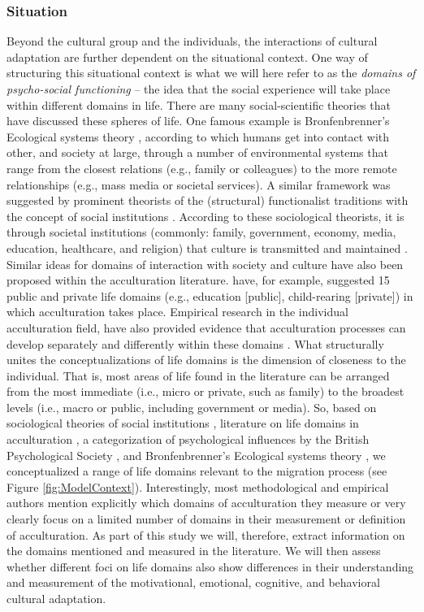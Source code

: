 \documentclass[man, 12pt, a4paper]{apa7}
\begin{document}
\subsubsection{Situation} 
Beyond the cultural group and the individuals, the interactions of cultural adaptation are further dependent on the situational context. One way of structuring this situational context is what we will here refer to as the \textit{domains of psycho-social functioning} -- the idea that the social experience will take place within different domains in life. There are many social-scientific theories that have discussed these spheres of life. One famous example is Bronfenbrenner's Ecological systems theory \citep{Bronfenbrenner1992}, according to which humans get into contact with other, and society at large, through a number of environmental systems that range from the closest relations (e.g., family or colleagues) to the more remote relationships (e.g., mass media or societal services). A similar framework was suggested by prominent theorists of the (structural) functionalist traditions with the concept of social institutions \citep[e.g.,][]{Turner1997}. According to these sociological theorists, it is through societal institutions (commonly: family, government, economy, media, education, healthcare, and religion) that culture is transmitted and maintained \citep[e.g.,][]{Durkheim1982}. Similar ideas for domains of interaction with society and culture have also been proposed within the acculturation literature. \citet{Arends-Toth2006, Arends-Toth2007} have, for example, suggested 15 public and private life domains (e.g., education [public], child-rearing [private]) in which acculturation takes place. Empirical research in the individual acculturation field, have also provided evidence that acculturation processes can develop separately and differently within these domains \citep[e.g.,][]{Arends-Toth2003a}. 
What structurally unites the conceptualizations of life domains is the dimension of closeness to the individual. That is, most areas of life found in the literature can be arranged from the most immediate (i.e., micro or private, such as family) to the broadest levels (i.e., macro or public, including government or media). So, based on sociological theories of social institutions \citep{Durkheim1982}, literature on life domains in acculturation \citep{Arends-Toth2006, Arends-Toth2007, Zane2004}, a categorization of psychological influences by the British Psychological Society \citep{Michie2005a}, and Bronfenbrenner's Ecological systems theory \citep{Bronfenbrenner1992}, we conceptualized a range of life domains relevant to the migration process (see Figure \ref{fig:ModelContext}). Interestingly, most methodological and empirical authors mention explicitly which domains of acculturation they measure or very clearly focus on a limited number of domains in their measurement or definition of acculturation. As part of this study we will, therefore, extract information on the domains mentioned and measured in the literature. We will then assess whether different foci on life domains also show differences in their understanding and measurement of the motivational, emotional, cognitive, and behavioral cultural adaptation.
\end{document}
